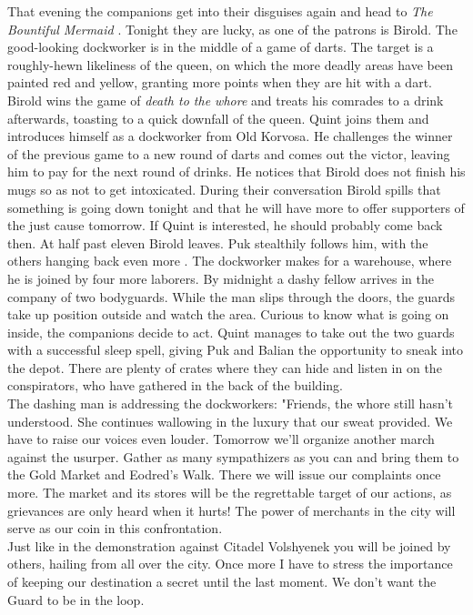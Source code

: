 That evening the companions get into their disguises again and head to {\itshape The Bountiful Mermaid} . Tonight they are lucky, as one of the patrons is Birold. The good-looking dockworker is in the middle of a game of darts. The target is a roughly-hewn likeliness of the queen, on which the more deadly areas have been painted red and yellow, granting more points when they are hit with a dart. Birold wins the game of  {\itshape death to the whore} and treats his comrades to a drink afterwards, toasting to a quick downfall of the queen. Quint joins them and introduces himself as a dockworker from Old Korvosa. He challenges the winner of the previous game to a new round of darts and comes out the victor, leaving him to pay for the next round of drinks. He notices that Birold does not finish his mugs so as not to get intoxicated. During their conversation Birold spills that something is going down tonight and that he will have more to offer supporters of the just cause tomorrow. If Quint is interested, he should probably come back then. At half past eleven Birold leaves. Puk stealthily follows him, with the others hanging back even more . The dockworker makes for a warehouse, where he is joined by four more laborers. By midnight a dashy fellow arrives in the company of two bodyguards. While the man slips through the doors, the guards take up position outside and watch the area. Curious to know what is going on inside, the companions decide to act. Quint manages to take out the two guards with a successful sleep spell, giving Puk and Balian the opportunity to sneak into the depot. There are plenty of crates where they can hide and listen in on the conspirators, who have gathered in the back of the building.\\

The dashing man is addressing the dockworkers: "Friends, the whore still hasn't understood. She continues wallowing in the luxury that our sweat provided. We have to raise our voices even louder. Tomorrow we'll organize another march against the usurper. Gather as many sympathizers as you can and bring them to the Gold Market and Eodred's Walk. There we will issue our complaints once more. The market and its stores will be the regrettable target of our actions, as grievances are only heard when it hurts! The power of merchants in the city will serve as our coin in this confrontation.\\

Just like in the demonstration against Citadel Volshyenek you will be joined by others, hailing from all over the city. Once more I have to stress the importance of keeping our destination a secret until the last moment. We don't want the Guard to be in the loop.\\

